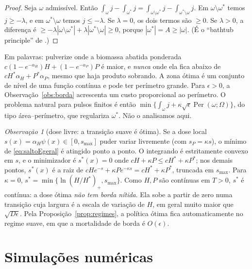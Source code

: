 \documentclass[11pt,a4paper]{article}
\numberwithin{equation}{section}
\theoremstyle{definition}
\theoremstyle{remark}
\newtheorem{observacao}[teorema]{Observação}
\newcommand{\Hs}{H^{*}}
\newcommand{\Ps}{P^{*}}
\newcommand{\Per}{\operatorname{Per}}
\begin{document}
\begin{proof}
Seja $\omega$ admissível. Então
$\int_\omega j-\int_{\omega^*}j=\int_{\omega\setminus\omega^*}j-\int_{\omega^*\setminus\omega}j$. Em
$\omega\setminus\omega^*$ temos $j\ge-\lambda$, e em $\omega^*\setminus\omega$ temos $j\le-\lambda$.
Se $\lambda=0$, os dois termos são $\ge0$. Se $\lambda>0$, a diferença é
$\ge-\lambda|\omega\setminus\omega^*|+\lambda|\omega^*\setminus\omega|\ge0$, porque
$|\omega^*|=A\ge|\omega|$. (É o ``bathtub principle'' de \cite{LiebLoss}.)
\end{proof}

Em palavras: pulverize onde a biomassa abatida ponderada $c(1-e^{-\alpha_H})H+(1-e^{-\alpha_P})P$ é
maior, e \emph{nunca} onde ela fica abaixo de $c\Hs\alpha_H+\Ps\alpha_P$, mesmo que haja produto
sobrando. A zona ótima é um conjunto de nível de uma função contínua e pode ter perímetro grande.
Para $\epsilon>0$, a Observação~\ref{obs:borda} acrescenta um custo proporcional ao perímetro.
O problema natural para pulsos finitos é então
$\min\{\int_\omega j+\kappa\sqrt\epsilon\Per(\omega;\Omega)\}$, do tipo área--perímetro, que regulariza
$\omega^*$. Não o analisamos aqui.

\begin{observacao}[dose livre: a transição suave é ótima]
Se a dose local $s(x)=\alpha_H\psi(x)\in[0,s_{\max}]$ puder variar livremente (com $s_P=\kappa s$), o mínimo de
\eqref{eq:saltoEgeral} é atingido ponto a ponto. O integrando é estritamente convexo em $s$, e o minimizador é
$s^*(x)=0$ onde $cH+\kappa P\le c\Hs+\kappa\Ps$; nos demais pontos, $s^*(x)$ é a raiz de
$cHe^{-s}+\kappa Pe^{-\kappa s}=c\Hs+\kappa\Ps$, truncada em $s_{\max}$. Para $\kappa=0$,
$s^*=\min\{\ln(H/\Hs)_+,s_{\max}\}$. Como $H,P$ são contínuas em $T>0$, $s^*$ é contínua: a dose ótima
\emph{não tem borda nítida}. Ela sobe a partir de zero numa transição cuja largura é a escala de variação
de $H$, em geral muito maior que $\sqrt{D\epsilon}$. Pela Proposição~\ref{prop:regimes}, a política
ótima fica automaticamente no regime suave, em que a mortalidade de borda é $O(\epsilon)$.
\end{observacao}

\section{Simulações numéricas}
\end{document}
